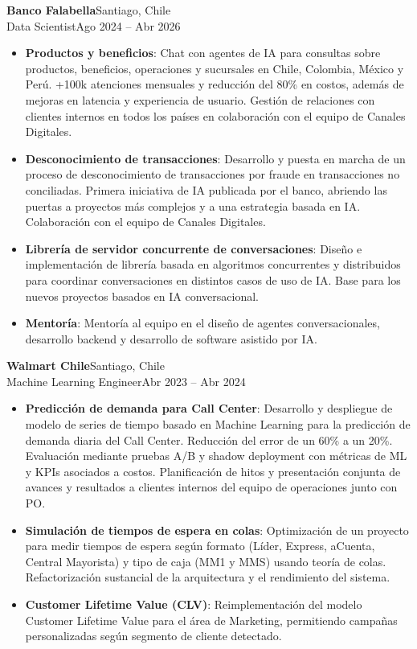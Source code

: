 \documentclass[letterpaper,11pt]{article}
\newcommand{\resumeItem}[2]{
  \item\small{
    \textbf{#1}{: #2\vspace{-2pt}}
  }
}
\newcommand{\resumeSubheading}[4]{%
  \Needspace{7\baselineskip}\vspace{-1pt}\item[]%
    \textbf{#1}\hfill{\small\color{meta}#2}\\[1pt]
    {\small #3}\hfill{\small\color{meta}#4}\vspace{-5pt}%
}
\newcommand{\resumeItemListStart}{\begin{itemize}}
\newcommand{\resumeItemListEnd}{\end{itemize}\vspace{-5pt}}
\begin{document}
    \resumeSubheading
      {Banco Falabella}{Santiago, Chile}
      {Data Scientist}{Ago 2024 -- Abr 2026}
      \resumeItemListStart
      \resumeItem{Productos y beneficios}
            {Chat con agentes de IA para consultas sobre productos, beneficios, operaciones y sucursales en Chile, Colombia, México y Perú. +100k atenciones mensuales y reducción del 80\% en costos, además de mejoras en latencia y experiencia de usuario. Gestión de relaciones con clientes internos en todos los países en colaboración con el equipo de Canales Digitales.}
        \resumeItem{Desconocimiento de transacciones}
          {Desarrollo y puesta en marcha de un proceso de desconocimiento de transacciones por fraude en transacciones no conciliadas. Primera iniciativa de IA publicada por el banco, abriendo las puertas a proyectos más complejos y a una estrategia basada en IA. Colaboración con el equipo de Canales Digitales.}
        \resumeItem{Librería de servidor concurrente de conversaciones}
          {Diseño e implementación de librería basada en algoritmos concurrentes y distribuidos para coordinar conversaciones en distintos casos de uso de IA. Base para los nuevos proyectos basados en IA conversacional.}
        \resumeItem{Mentoría}
          {Mentoría al equipo en el diseño de agentes conversacionales, desarrollo backend y desarrollo de software asistido por IA.}
      \resumeItemListEnd

    \resumeSubheading
      {Walmart Chile}{Santiago, Chile}
      {Machine Learning Engineer}{Abr 2023 -- Abr 2024}
      \resumeItemListStart
        \resumeItem{Predicción de demanda para Call Center}
          {Desarrollo y despliegue de modelo de series de tiempo basado en Machine Learning para la predicción de demanda diaria del Call Center. Reducción del error de un 60\% a un 20\%. Evaluación mediante pruebas A/B y shadow deployment con métricas de ML y KPIs asociados a costos. Planificación de hitos y presentación conjunta de avances y resultados a clientes internos del equipo de operaciones junto con PO.}
        \resumeItem{Simulación de tiempos de espera en colas}
          {Optimización de un proyecto para medir tiempos de espera según formato (Líder, Express, aCuenta, Central Mayorista) y tipo de caja (MM1 y MMS) usando teoría de colas. Refactorización sustancial de la arquitectura y el rendimiento del sistema.}
        \resumeItem{Customer Lifetime Value (CLV)}
          {Reimplementación del modelo Customer Lifetime Value para el área de Marketing, permitiendo campañas personalizadas según segmento de cliente detectado.}
      \resumeItemListEnd
\end{document}
